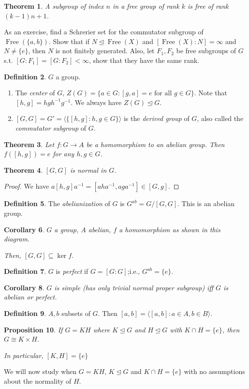 \documentclass{amsart}
\newtheorem{thm}{Theorem}[section]
\newtheorem{prop}[thm]{Proposition}
\newtheorem{cor}[thm]{Corollary}
\theoremstyle{definition}
\newtheorem{definition}[thm]{Definition}
\DeclareMathOperator{\Free}{Free}
\begin{document}
\begin{thm}
	A subgroup of index $n$ in a free group of rank  $k$ is free of rank $(k-1)n+1$.
\end{thm}
As an exercise, find a Schrerier set for the commutator subgroup of $\Free(\{a,b\})$. Show that if $N\unlhd \Free(X)$ and $[\Free(X):N]=\infty$ and $N\not=\{e\}$, then $N$ is not finitely generated. Also, let $F_1,F_2$ be free subgroups of $G$ s.t. $[G:F_1]=[G:F_2]<\infty$, show that they have the same rank.
\begin{definition}
	$G$ a group. 
	\begin{enumerate}
		\item The \emph{center} of $G$, $Z(G)=\{a\in G:[g,a]=e\text{ for all }g\in G\}$. Note that $[h,g]=hgh^{-1}g^{-1}$.
		We always have $Z(G)\unlhd G$.
		\item $[G,G]=G'=\langle \{[h,g]:h,g\in G\}\rangle$ is the \emph{derived group} of $G$, also called the \emph{commutator subgroup} of $G$.
	\end{enumerate}
\end{definition}
\begin{thm}
	Let $f:G\to A$ be a homomorphism to an abelian group. Then $f([h,g])=e$ for any $h,g\in G$.
\end{thm}
\begin{thm}
	$[G,G]$ is normal in $G$.
\end{thm}
\begin{proof}
	We have $a[h,g]a^{-1}=[aha^{-1},aga^{-1}]\in[G,g]$.
\end{proof}
\begin{definition}
	The \emph{abelianization} of $G$ is $G^{ab}=G/[G,G]$. This is an abelian group.
\end{definition}
\begin{cor}
	$G$ a group, $A$ abelian, $f$ a homomorphism as shown in this diagram. 
Then, $[G,G]\subseteq \ker f$.
\end{cor}
\begin{definition}
	$G$ is \emph{perfect} if $G=[G:G]$;i.e., $G^{ab}=\{e\}$.
\end{definition}
\begin{cor}
	$G$ is simple (has only trivial normal proper subgroup) iff $G$ is abelian or perfect.
\end{cor}
\begin{definition}
	$A,b$ subsets of $G$. Then $[a,b]=\langle[a,b]:a\in A, b\in B\rangle$.
\end{definition}
\begin{prop}
	If $G=KH$ where $K\unlhd G$ and $H\unlhd G$ with $K\cap H=\{e\}$, then $G\cong K\times H$.
	
	In particular, $[K,H]=\{e\}$
\end{prop}
We will now study when $G=KH$, $K\unlhd G$ and $K\cap H=\{e\}$ with no assumptions about the normality of $H$.
\end{document}

